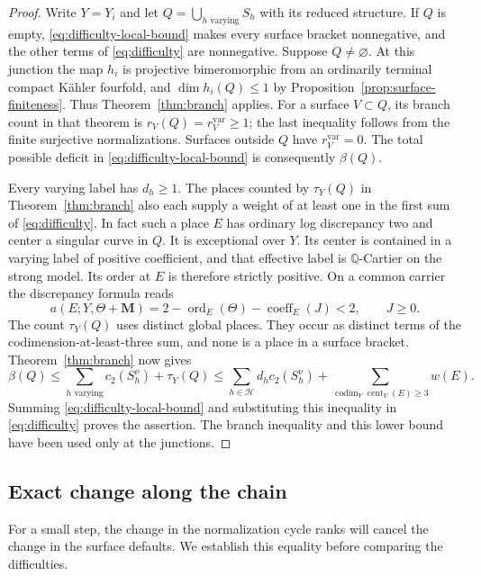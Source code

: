 \documentclass[11pt]{amsart}
\theoremstyle{definition}
\theoremstyle{remark}
\numberwithin{equation}{section}
\newcommand{\Q}{\mathbb{Q}}
\newcommand{\M}{\mathbf{M}}
\DeclareMathOperator{\cent}{cent}
\DeclareMathOperator{\ord}{ord}
\DeclareMathOperator{\codim}{codim}
\begin{document}
\begin{proof}
Write \(Y=Y_i\) and let
\(Q=\bigcup_{h\text{ varying}}S_h\) with its reduced structure.  If
\(Q\) is empty, \eqref{eq:difficulty-local-bound} makes every surface
bracket nonnegative, and the other terms of \eqref{eq:difficulty} are
nonnegative.  Suppose \(Q\ne\varnothing\).  At this junction the map
\(h_i\) is projective bimeromorphic from an ordinarily terminal compact
K\"ahler fourfold, and \(\dim h_i(Q)\leq1\) by
Proposition~\ref{prop:surface-finiteness}.  Thus Theorem~\ref{thm:branch}
applies.  For a surface \(V\subset Q\), its branch count in that theorem
is \(r_V(Q)=r_V^{\mathrm{var}}\geq1\); the last inequality follows from
the finite surjective normalizations.  Surfaces outside \(Q\) have
\(r_V^{\mathrm{var}}=0\).  The total possible deficit in
\eqref{eq:difficulty-local-bound} is consequently \(\beta(Q)\).

Every varying label has \(d_h\geq1\).  The places counted by
\(\tau_Y(Q)\) in Theorem~\ref{thm:branch} also each supply a weight of at
least one in the first sum of \eqref{eq:difficulty}.  In fact such a place
\(E\) has ordinary log discrepancy two and center a singular curve in
\(Q\).  It is exceptional over \(Y\).  Its center is contained in a
varying label of positive coefficient, and that effective label is
\(\Q\)-Cartier on the strong model.  Its order at \(E\) is therefore
strictly positive.  On a common carrier the discrepancy formula reads
\[
 a(E;Y,\Theta+\M)
 =2-\ord_E(\Theta)-\operatorname{coeff}_E(J)<2,
 \qquad J\geq0.
\]
The count \(\tau_Y(Q)\) uses distinct global places.  They occur as
distinct terms of the codimension-at-least-three sum, and none is a place
in a surface bracket.  Theorem~\ref{thm:branch} now gives
\[
 \beta(Q)
 \leq\sum_{h\text{ varying}}c_2(S_h^\nu)+\tau_Y(Q)
 \leq\sum_{h\in\mathcal H}d_hc_2(S_h^\nu)
       +\sum_{\codim_Y\cent_Y(E)\geq3}w(E).
\]
Summing \eqref{eq:difficulty-local-bound} and substituting this inequality
in \eqref{eq:difficulty} proves the assertion.  The branch inequality and
this lower bound have been used only at the junctions.
\end{proof}

\subsection{Exact change along the chain}

For a small step, the change in the normalization cycle ranks will cancel
the change in the surface defaults.  We establish this equality before
comparing the difficulties.
\end{document}
